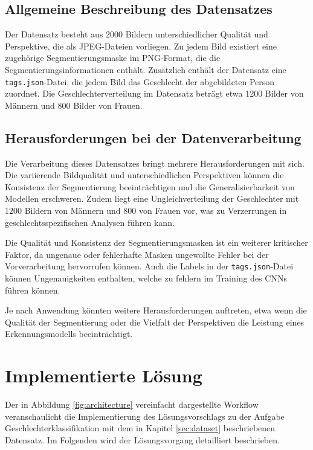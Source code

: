 \documentclass[journal,twoside,web]{ieeecolor}
\begin{document}
\subsection{Allgemeine Beschreibung des Datensatzes}
\label{sec:dataset_description}
Der Datensatz besteht aus 2000 Bildern unterschiedlicher Qualität und Perspektive, die als JPEG-Dateien vorliegen. Zu jedem Bild existiert eine zugehörige Segmentierungsmaske im PNG-Format, die die Segmentierungsinformationen enthält. Zusätzlich enthält der Datensatz eine \texttt{tags.json}-Datei, die jedem Bild das Geschlecht der abgebildeten Person zuordnet. Die Geschlechterverteilung im Datensatz beträgt etwa 1200 Bilder von Männern und 800 Bilder von Frauen.

\subsection{Herausforderungen bei der Datenverarbeitung}  
Die Verarbeitung dieses Datensatzes bringt mehrere Herausforderungen mit sich. Die variierende Bildqualität und unterschiedlichen Perspektiven können die Konsistenz der Segmentierung beeinträchtigen und die Generalisierbarkeit von Modellen erschweren. Zudem liegt eine Ungleichverteilung der Geschlechter mit 1200 Bildern von Männern und 800 von Frauen vor, was zu Verzerrungen in geschlechtsspezifischen Analysen führen kann. 

Die Qualität und Konsistenz der Segmentierungsmasken ist ein weiterer kritischer Faktor, da ungenaue oder fehlerhafte Masken ungewollte Fehler bei der Vorverarbeitung hervorrufen können. Auch die Labels in der \texttt{tags.json}-Datei können Ungenauigkeiten enthalten, welche zu fehlern im Training des CNNs führen können. 

Je nach Anwendung könnten weitere Herausforderungen auftreten, etwa wenn die Qualität der Segmentierung oder die Vielfalt der Perspektiven die Leistung eines Erkennungsmodells beeinträchtigt. %

\section{Implementierte Lösung}

Der in Abbildung \ref{fig:architecture} vereinfacht dargestellte Workflow veranschaulicht die Implementierung des Lösungsvorschlags zu der Aufgabe Geschlechterklassifikation mit dem in Kapitel \ref{sec:dataset} beschriebenen Datensatz. Im Folgenden wird der Lösungsvorgang detailliert beschrieben.
\end{document}

